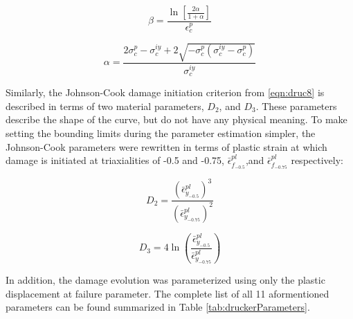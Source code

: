 \begin{equation}
\beta=\frac{\ln\left[\frac{2\alpha}{1+\alpha} \right ]}{\epsilon_c^{p}}
\label{eqn:param2-2}
\end{equation}

\begin{equation}
\alpha =\frac{2\sigma_c^{p}-\sigma_c^{iy}+2\sqrt{-\sigma_c^p\left(\sigma_c^{iy}-\sigma_c^p \right )}}{\sigma_c^{iy}}
\label{eqn:param2-3}
\end{equation}


Similarly, the Johnson-Cook damage initiation criterion from \ref{eqn:druc8} is described in terms of two material parameters, $D_2$, and $D_3$. These parameters describe the shape of the curve, but do not have any physical meaning. To make setting the bounding limits during the parameter estimation simpler, the Johnson-Cook parameters were rewritten in terms of plastic strain at which damage is initiated at triaxialities of -0.5 and -0.75, $\bar{\epsilon}^{pl}_{f_{-0.5}}$,and $\bar{\epsilon}^{pl}_{f_{-0.75}}$ respectively:

\begin{equation}
D_2=\frac{\left(\bar{\epsilon}^{pl}_{y_{-0.5}}\right)^3}{\left(\bar{\epsilon}^{pl}_{y_{-0.75}}\right)^2}
\label{eqn:dparam8}
\end{equation}

\begin{equation}
D_3=4\ln \left (\frac{\bar{\epsilon}^{pl}_{y_{-0.5}}}{\bar{\epsilon}^{pl}_{y_{-0.75}}}\right )
\label{eqn:dparam9}
\end{equation}

In addition, the damage evolution was parameterized using only the plastic displacement at failure parameter. The complete list of all 11 aformentioned parameters can be found summarized in Table \ref{tab:druckerParameters}.

